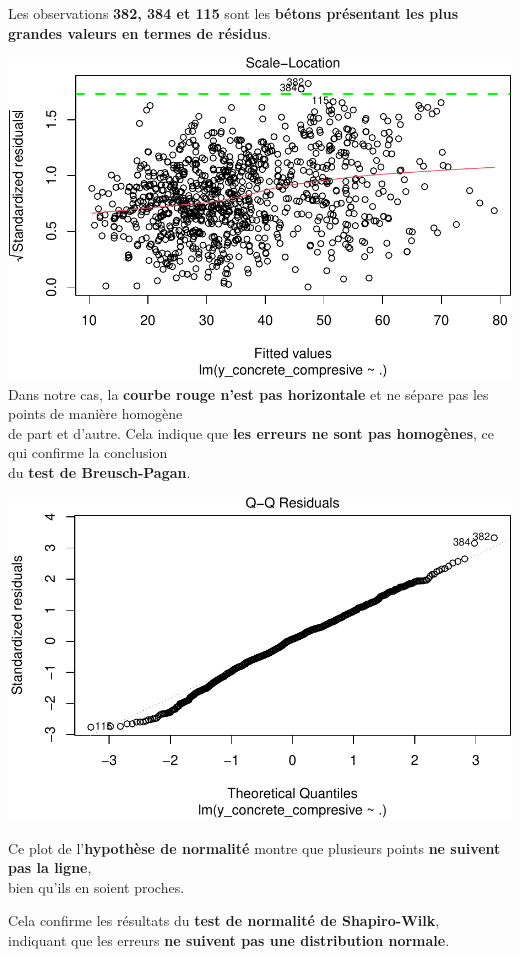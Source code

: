 \documentclass[
  12pt,
]{article}
\begin{document}
Les observations \textbf{382, 384 et 115} sont les \textbf{bétons
présentant les plus grandes valeurs en termes de résidus}.

\includegraphics{rmd_final_files/figure-latex/unnamed-chunk-26-1.pdf}
Dans notre cas, la \textbf{courbe rouge n'est pas horizontale} et ne
sépare pas les points de manière homogène\\
de part et d'autre. Cela indique que \textbf{les erreurs ne sont pas
homogènes}, ce qui confirme la conclusion\\
du \textbf{test de Breusch-Pagan}.

\includegraphics{rmd_final_files/figure-latex/unnamed-chunk-27-1.pdf}

Ce plot de l'\textbf{hypothèse de normalité} montre que plusieurs points
\textbf{ne suivent pas la ligne},\\
bien qu'ils en soient proches.

Cela confirme les résultats du \textbf{test de normalité de
Shapiro-Wilk},\\
indiquant que les erreurs \textbf{ne suivent pas une distribution
normale}.
\end{document}
